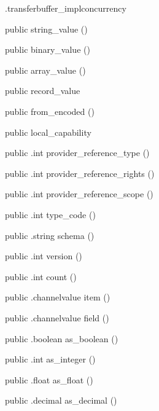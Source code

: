 \begin{CrexxClass}{.transferbuffer\_impl}{concurrency}
\begin{Members}
    \Factory
      {public}
      {string\_value}
      {()}

    \Factory
      {public}
      {binary\_value}
      {()}

    \Factory
      {public}
      {array\_value}
      {()}

    \Factory
      {public}
      {record\_value}
      {}

    \Factory
      {public}
      {from\_encoded}
      {()}

    \Factory
      {public}
      {local\_capability}
      {}

    \Method
      {public}
      {.int}
      {provider\_reference\_type}
      {()}

    \Method
      {public}
      {.int}
      {provider\_reference\_rights}
      {()}

    \Method
      {public}
      {.int}
      {provider\_reference\_scope}
      {()}

    \Method
      {public}
      {.int}
      {type\_code}
      {()}

    \Method
      {public}
      {.string}
      {schema}
      {()}

    \Method
      {public}
      {.int}
      {version}
      {()}

    \Method
      {public}
      {.int}
      {count}
      {()}

    \Method
      {public}
      {.channelvalue}
      {item}
      {()}

    \Method
      {public}
      {.channelvalue}
      {field}
      {()}

    \Method
      {public}
      {.boolean}
      {as\_boolean}
      {()}

    \Method
      {public}
      {.int}
      {as\_integer}
      {()}

    \Method
      {public}
      {.float}
      {as\_float}
      {()}

    \Method
      {public}
      {.decimal}
      {as\_decimal}
      {()}


\end{Members}
\end{CrexxClass}
